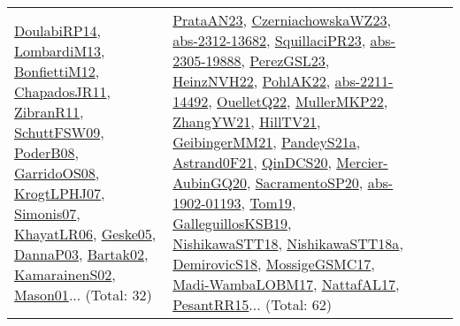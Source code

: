 {\begin{longtable}{lp{3cm}>{\raggedright}p{6cm}>{\raggedright}p{6cm}p{8cm}}
\href{papers/DoulabiRP14.pdf}{DoulabiRP14}\cite{DoulabiRP14}, \href{papers/LombardiM13.pdf}{LombardiM13}\cite{LombardiM13}, \href{papers/BonfiettiM12.pdf}{BonfiettiM12}\cite{BonfiettiM12}, \href{papers/ChapadosJR11.pdf}{ChapadosJR11}\cite{ChapadosJR11}, \href{papers/ZibranR11.pdf}{ZibranR11}\cite{ZibranR11}, \href{papers/SchuttFSW09.pdf}{SchuttFSW09}\cite{SchuttFSW09}, \href{papers/PoderB08.pdf}{PoderB08}\cite{PoderB08}, \href{articles/GarridoOS08.pdf}{GarridoOS08}\cite{GarridoOS08}, \href{papers/KrogtLPHJ07.pdf}{KrogtLPHJ07}\cite{KrogtLPHJ07}, \href{articles/Simonis07.pdf}{Simonis07}\cite{Simonis07}, \href{articles/KhayatLR06.pdf}{KhayatLR06}\cite{KhayatLR06}, \href{papers/Geske05.pdf}{Geske05}\cite{Geske05}, \href{papers/DannaP03.pdf}{DannaP03}\cite{DannaP03}, \href{papers/Bartak02.pdf}{Bartak02}\cite{Bartak02}, \href{papers/KamarainenS02.pdf}{KamarainenS02}\cite{KamarainenS02}, \href{articles/Mason01.pdf}{Mason01}\cite{Mason01}... (Total: 32) & \href{articles/PrataAN23.pdf}{PrataAN23}\cite{PrataAN23}, \href{articles/CzerniachowskaWZ23.pdf}{CzerniachowskaWZ23}\cite{CzerniachowskaWZ23}, \href{articles/abs-2312-13682.pdf}{abs-2312-13682}\cite{abs-2312-13682}, \href{papers/SquillaciPR23.pdf}{SquillaciPR23}\cite{SquillaciPR23}, \href{articles/abs-2305-19888.pdf}{abs-2305-19888}\cite{abs-2305-19888}, \href{papers/PerezGSL23.pdf}{PerezGSL23}\cite{PerezGSL23}, \href{articles/HeinzNVH22.pdf}{HeinzNVH22}\cite{HeinzNVH22}, \href{articles/PohlAK22.pdf}{PohlAK22}\cite{PohlAK22}, \href{articles/abs-2211-14492.pdf}{abs-2211-14492}\cite{abs-2211-14492}, \href{papers/OuelletQ22.pdf}{OuelletQ22}\cite{OuelletQ22}, \href{articles/MullerMKP22.pdf}{MullerMKP22}\cite{MullerMKP22}, \href{articles/ZhangYW21.pdf}{ZhangYW21}\cite{ZhangYW21}, \href{papers/HillTV21.pdf}{HillTV21}\cite{HillTV21}, \href{papers/GeibingerMM21.pdf}{GeibingerMM21}\cite{GeibingerMM21}, \href{articles/PandeyS21a.pdf}{PandeyS21a}\cite{PandeyS21a}, \href{papers/Astrand0F21.pdf}{Astrand0F21}\cite{Astrand0F21}, \href{articles/QinDCS20.pdf}{QinDCS20}\cite{QinDCS20}, \href{papers/Mercier-AubinGQ20.pdf}{Mercier-AubinGQ20}\cite{Mercier-AubinGQ20}, \href{articles/SacramentoSP20.pdf}{SacramentoSP20}\cite{SacramentoSP20}, \href{articles/abs-1902-01193.pdf}{abs-1902-01193}\cite{abs-1902-01193}, \href{papers/Tom19.pdf}{Tom19}\cite{Tom19}, \href{papers/GalleguillosKSB19.pdf}{GalleguillosKSB19}\cite{GalleguillosKSB19}, \href{papers/NishikawaSTT18.pdf}{NishikawaSTT18}\cite{NishikawaSTT18}, \href{papers/NishikawaSTT18a.pdf}{NishikawaSTT18a}\cite{NishikawaSTT18a}, \href{papers/DemirovicS18.pdf}{DemirovicS18}\cite{DemirovicS18}, \href{papers/MossigeGSMC17.pdf}{MossigeGSMC17}\cite{MossigeGSMC17}, \href{papers/Madi-WambaLOBM17.pdf}{Madi-WambaLOBM17}\cite{Madi-WambaLOBM17}, \href{articles/NattafAL17.pdf}{NattafAL17}\cite{NattafAL17}, \href{papers/PesantRR15.pdf}{PesantRR15}\cite{PesantRR15}... (Total: 62)\\

\end{longtable}}

